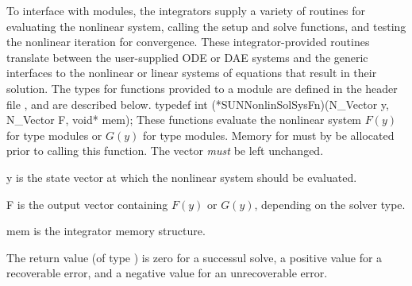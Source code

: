 To interface with {\sunnonlinsol} modules, the {\sundials} integrators
supply a variety of routines for evaluating the nonlinear system,
calling the {\sunlinsol} setup and solve functions, and testing the
nonlinear iteration for convergence.  These integrator-provided routines
translate between the user-supplied ODE or DAE systems and the generic
interfaces to the nonlinear or linear systems of equations that result
in their solution. The types for functions provided to a {\sunnonlinsol}
module are defined in the header file
, and are described below.
{
  typedef int (*SUNNonlinSolSysFn)(N\_Vector y, N\_Vector F, void* mem);
}
{
  These functions evaluate the nonlinear system $F(y)$
  for  type modules or $G(y)$
  for  type modules. Memory
  for  must by be allocated prior to calling this function. The
  vector  \textit{must} be left unchanged.
}
{
  \begin{args}[mem]
  \item[y]
    is the state vector at which the nonlinear system should be evaluated.
  \item[F]
    is the output vector containing $F(y)$ or $G(y)$, depending on the
    solver type.
  \item[mem]
    is the {\sundials} integrator memory structure.
  \end{args}
}
{
  The return value  (of type ) is zero for a
  successul solve, a positive value for a recoverable error, and a
  negative value for an unrecoverable error.
}
